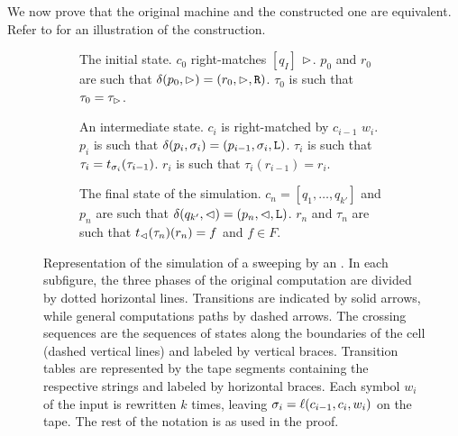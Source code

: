 We now prove that the original machine and the constructed one are equivalent.
Refer to  for an illustration of the construction.
\begin{figure}
	\centering
	\begin{subfigure}[b]{0.32\textwidth}
		\centering
		
		\caption{The initial state.
			$c_0$ right-matches $[q_I]$ \wrt $\rhd$.
			$p_0$ and $r_0$ are such that $\delta(p_0,\rhd)=(r_0,\rhd,\mathtt R)$.
			$\tau_0$ is such that $\tau_0=\tau_\rhd$.\newline}
		\label{sfig:swepkDLAtoNFA-start}
	\end{subfigure}
	\hfill
	\begin{subfigure}[b]{0.32\textwidth}
		\centering
		
		\caption{An intermediate state.
			$c_i$ is right-matched by $c_{i-1}$ \wrt $w_i$.
			$p_i$ is such that $\delta(p_i,\sigma_i)=(p_{i-1},\sigma_i,\mathtt L)$.
			$\tau_i$ is such that $\tau_i=t_{\sigma_i}(\tau_{i-1})$.
			$r_i$ is such that $\tau_i(r_{i-1})=r_i$.}
		\label{sfig:swepkDLAtoNFA-mid}
	\end{subfigure}
	\hfill
	\begin{subfigure}[b]{0.33\textwidth}
		\centering
		
		\caption{The final state of the simulation.
		$c_n=[q_1,\dots,q_{k'}]$ and $p_n$ are such that $\delta(q_{k'},\lhd)=(p_n,\lhd,\mathtt L)$.
		$r_n$ and $\tau_n$ are such that $t_\lhd(\tau_n)(r_n)=f$ and $f\in F$.\newline}
		\label{sfig:swepkDLAtoNFA-end}
	\end{subfigure}

	\caption{Representation of the simulation of a sweeping \kDLA by an \NFA.
		In each subfigure, the three phases of the original computation are divided by dotted horizontal lines.
		Transitions are indicated by solid arrows, while general computations paths by dashed arrows.
		The crossing sequences are the sequences of states along the boundaries of the cell (dashed vertical lines) and labeled by vertical braces.
		Transition tables are represented by the tape segments containing the respective strings and labeled by horizontal braces.
		Each symbol $w_i$ of the input is rewritten $k$ times, leaving $\sigma_i=\ell(c_{i-1},c_i,w_i)$ on the tape.
		The rest of the notation is as used in the proof.}
	\label{fig:swepkDLAtoNFA}
\end{figure}

